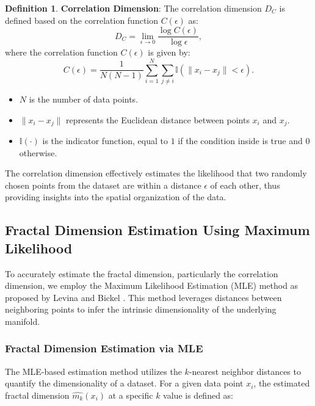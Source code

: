 \documentclass{article}
\theoremstyle{plain}
\theoremstyle{definition}
\newtheorem{definition}[theorem]{Definition}
\theoremstyle{remark}
\begin{document}
\begin{definition}
\textbf{Correlation Dimension}: The correlation dimension $D_C$ is defined based on the correlation function $C(\epsilon)$ as:
\begin{equation}
D_C = \lim_{\epsilon \to 0} \frac{\log C(\epsilon)}{\log \epsilon},
\end{equation}
where the correlation function $C(\epsilon)$ is given by:
\begin{equation}
C(\epsilon) = \frac{1}{N(N-1)} \sum_{i=1}^N \sum_{j \neq i} \mathbb{I}(\|x_i - x_j\| < \epsilon).
\end{equation}

\begin{itemize}
    \item $N$ is the number of data points.
    \item $\|x_i - x_j\|$ represents the Euclidean distance between points $x_i$ and $x_j$.
    \item $\mathbb{I}(\cdot)$ is the indicator function, equal to $1$ if the condition inside is true and $0$ otherwise.
\end{itemize}

The correlation dimension effectively estimates the likelihood that two randomly chosen points from the dataset are within a distance $\epsilon$ of each other, thus providing insights into the spatial organization of the data.

\end{definition}

\subsection{Fractal Dimension Estimation Using Maximum Likelihood}

To accurately estimate the fractal dimension, particularly the correlation dimension, we employ the Maximum Likelihood Estimation (MLE) method as proposed by Levina and Bickel \citep{levina2004maximum}. This method leverages distances between neighboring points to infer the intrinsic dimensionality of the underlying manifold.

\subsubsection{Fractal Dimension Estimation via MLE}

The MLE-based estimation method utilizes the $k$-nearest neighbor distances to quantify the dimensionality of a dataset. For a given data point $x_i$, the estimated fractal dimension $\hat{m_k}(x_i)$ at a specific $k$ value is defined as:
\end{document}
